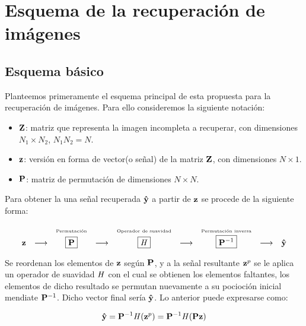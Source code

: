 \chapter{Esquema de la recuperaci\'on de im\'agenes}\label{chapter:PRA} %

\section{Esquema b\'asico}
Planteemos primeramente el esquema principal de esta propuesta para la recuperaci\'on de im\'agenes. Para ello consideremos la siguiente notaci\'on:

\begin{itemize}
	\item $\Z$: matriz que representa la imagen incompleta a recuperar, con dimensiones $N_1 \times N_2$, $N_1N_2 = N$.
	\item $\z$: versión en forma de vector(o señal) de la matriz $\Z$, con dimensiones $N \times 1$.
	\item $\P$: matriz de permutaci\'on de dimensiones $N \times N$.
\end{itemize}

Para obtener la una señal recuperada $\yhat$ a partir de $\z$ se procede de la siguiente forma:

\begin{equation}
	\begin{array}[t]{ccccccccc}
	& & \mbox{\tiny{Permutaci\'on}} & & \mbox{\tiny{Operador de suavidad}} & & \mbox{\tiny{Permutaci\'on inversa}} & &\\
	\z & \longrightarrow & \boxed{\P} & \longrightarrow & \boxed{\H} & \longrightarrow & \boxed{\P^{-1}} & \longrightarrow & \yhat \\
	\end{array}
	\label{basic:scheme}
\end{equation}

Se reordenan los elementos de $\z$ seg\'un $\P$, y a la señal resultante $\z^p$ se le aplica un operador de suavidad $\H$ con el cual se obtienen los elementos faltantes, los elementos de dicho resultado se permutan nuevamente a su pocioci\'on inicial mendiate $\P^{-1}$. Dicho vector final ser\'ia $\yhat$. Lo anterior puede expresarse como:

\begin{equation}
\yhat = \P^{-1}\H(\z^p) = \P^{-1}\H(\P\z)
\label{basic:formula}
\end{equation}

